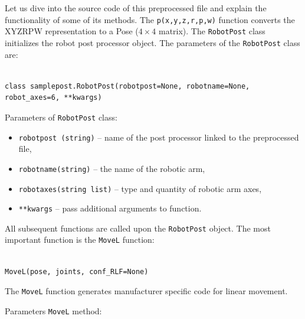 Let us dive into the source code of this preprocessed file and explain the functionality of some of its methods. The \texttt{p(x,y,z,r,p,w)} function converts the XYZRPW representation to a Pose ($ 4 \times 4 $ matrix). The \texttt{RobotPost} class initializes the robot post processor object. The parameters of the \texttt{RobotPost} class are:


\begin{verbatim}

class samplepost.RobotPost(robotpost=None, robotname=None, robot_axes=6, **kwargs)

\end{verbatim}


Parameters of \texttt{RobotPost} class:

\begin{itemize}

\item \texttt{robotpost (string)} -- name of the post processor linked to the preprocessed file,

\item \texttt{robotname(string)} -- the name of the robotic arm,

\item \texttt{robotaxes(string list)} -- type and quantity of robotic arm axes,

\item \texttt{**kwargs} -- pass additional arguments to function.

\end{itemize}




All subsequent functions are called upon the \texttt{RobotPost} object. The most important function is the \texttt{MoveL} function:


\begin{verbatim}

MoveL(pose, joints, conf_RLF=None)

\end{verbatim}

The \texttt{MoveL} function generates manufacturer specific code for linear movement. 


Parameters \texttt{MoveL} method:

